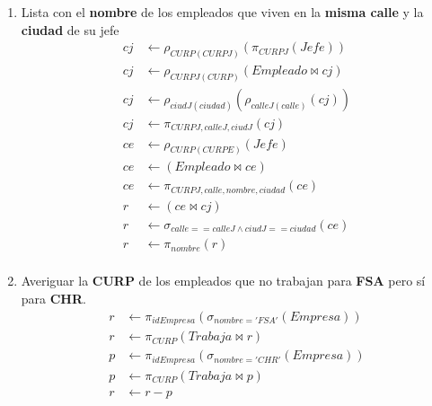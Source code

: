 \documentclass{article}
\begin{document}
\begin{enumerate}
{{\begin{enumerate}
{\begin{align*}
                            r &\leftarrow \pi_{nombre, CURP}(\sigma_{ciudad=ciudadEmpr}(r))
                        \end{align*}
                    }
                    \item {
                        Lista con el  \textbf{nombre} de los empleados que viven
                        en la \textbf{misma calle} y la \textbf{ciudad} de su jefe
                        \begin{align*}
                            cj &\leftarrow \rho_{CURP(CURPJ)}(\pi_{CURPJ}(Jefe)) \\
                            cj &\leftarrow \rho_{CURPJ(CURP)}(Empleado \bowtie cj)\\
                            cj &\leftarrow \rho_{ciudJ(ciudad)}(\rho_{calleJ(calle)}(cj))\\
                            cj &\leftarrow \pi_{CURPJ,calleJ,ciudJ}(cj) \\
                            ce &\leftarrow \rho_{CURP(CURPE)}(Jefe) \\
                            ce &\leftarrow (Empleado \bowtie ce) \\
                            ce &\leftarrow \pi_{CURPJ,calle,nombre,ciudad}(ce) \\
                            r &\leftarrow  (ce \bowtie cj)\\
                            r &\leftarrow \sigma_{calle == calleJ\land ciudJ == ciudad}(ce)\\
                            r &\leftarrow \pi_{nombre}(r) \\
                        \end{align*}
                    }
                    \item {
                        Averiguar la \textbf{CURP} de los empleados que no
                        trabajan para \textbf{FSA} pero sí para \textbf{CHR}.
                        \begin{align*}
                            r &\leftarrow \pi_{idEmpresa}(\sigma_{nombre = 'FSA'}(Empresa)) \\
                            r &\leftarrow \pi_{CURP}(Trabaja \bowtie r) \\
                            p &\leftarrow \pi_{idEmpresa}(\sigma_{nombre = 'CHR'}(Empresa)) \\
                            p &\leftarrow \pi_{CURP}(Trabaja \bowtie p) \\
                            r &\leftarrow r - p

\end{align*}}
\end{enumerate}}}
\end{enumerate}
\end{document}
